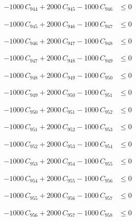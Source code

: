 \documentclass[a4paper,11pt]{article}
\begin{document}
\begin{align}
-1000\,C_{944} + 2000\,C_{945} - 1000\,C_{946} &\leq 0 \nonumber
\end{align}

\begin{align}
-1000\,C_{945} + 2000\,C_{946} - 1000\,C_{947} &\leq 0 \nonumber
\end{align}

\begin{align}
-1000\,C_{946} + 2000\,C_{947} - 1000\,C_{948} &\leq 0 \nonumber
\end{align}

\begin{align}
-1000\,C_{947} + 2000\,C_{948} - 1000\,C_{949} &\leq 0 \nonumber
\end{align}

\begin{align}
-1000\,C_{948} + 2000\,C_{949} - 1000\,C_{950} &\leq 0 \nonumber
\end{align}

\begin{align}
-1000\,C_{949} + 2000\,C_{950} - 1000\,C_{951} &\leq 0 \nonumber
\end{align}

\begin{align}
-1000\,C_{950} + 2000\,C_{951} - 1000\,C_{952} &\leq 0 \nonumber
\end{align}

\begin{align}
-1000\,C_{951} + 2000\,C_{952} - 1000\,C_{953} &\leq 0 \nonumber
\end{align}

\begin{align}
-1000\,C_{952} + 2000\,C_{953} - 1000\,C_{954} &\leq 0 \nonumber
\end{align}

\begin{align}
-1000\,C_{953} + 2000\,C_{954} - 1000\,C_{955} &\leq 0 \nonumber
\end{align}

\begin{align}
-1000\,C_{954} + 2000\,C_{955} - 1000\,C_{956} &\leq 0 \nonumber
\end{align}

\begin{align}
-1000\,C_{955} + 2000\,C_{956} - 1000\,C_{957} &\leq 0 \nonumber
\end{align}

\begin{align}
-1000\,C_{956} + 2000\,C_{957} - 1000\,C_{958} &\leq 0 \nonumber
\end{align}
\end{document}
